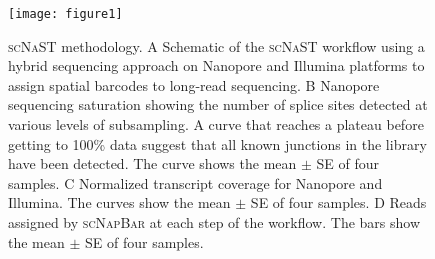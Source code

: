 \documentclass[utf8]{FrontiersinHarvard} %
\newcommand{\scn}{\textsc{scNapBar}\xspace}
\newcommand{\scnast}{\textsc{scNaST}\xspace}
\begin{document}

\begin{figure}[h!]
\begin{center}
\texttt{[image: figure1]}
\end{center}
\caption{\scnast methodology. A Schematic of the \scnast workflow using a hybrid sequencing approach on Nanopore and Illumina platforms to assign spatial barcodes to long-read sequencing. B Nanopore sequencing saturation showing the number of splice sites detected at various levels of subsampling. A curve that reaches a plateau before getting to 100\% data suggest that all known junctions in the library have been detected. The curve shows the mean $\pm$ SE of four samples. C Normalized transcript coverage for Nanopore and Illumina. The curves show the mean $\pm$ SE of four samples. D Reads assigned by \scn at each step of the workflow. The bars show the mean $\pm$ SE of four samples.}\label{fig:1}
\end{figure}
\end{document}
